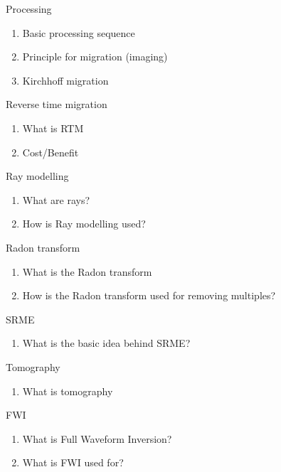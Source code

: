 \documentclass[xcolor=dvipsnames,notes]{beamer}
\begin{document}
\begin{frame}{Processing}
\begin{enumerate}
  \item Basic processing sequence
  \item Principle for migration (imaging)
  \item Kirchhoff migration
\end{enumerate}
\end{frame}
\begin{frame}{Reverse time migration}
\begin{enumerate}
  \item What is RTM 
  \item Cost/Benefit
\end{enumerate}
\end{frame}
\begin{frame}{Ray modelling}
\begin{enumerate}
  \item What are rays?
  \item How is Ray modelling used?
\end{enumerate}
\end{frame}
\begin{frame}{Radon transform}
\begin{enumerate}
  \item What is the Radon transform
  \item How is the Radon transform used for 
        removing multiples?
\end{enumerate}
\end{frame}
\begin{frame}{SRME}
\begin{enumerate}
  \item What is the basic idea behind SRME?
\end{enumerate}
\end{frame}
\begin{frame}{Tomography}
\begin{enumerate}
  \item What is tomography
\end{enumerate}
\end{frame}
\begin{frame}{FWI}
\begin{enumerate}
  \item What is Full Waveform Inversion? 
  \item What is FWI used for?
\end{enumerate}
\end{frame}
\end{document}
